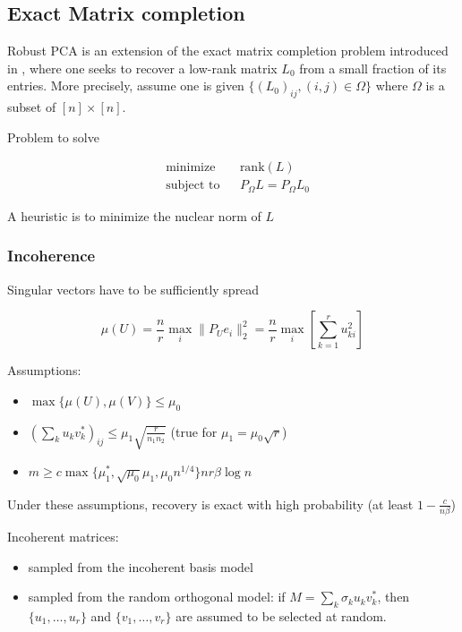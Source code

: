 \documentclass{../common/projectreport}
\begin{document}
\subsection{Exact Matrix completion}
Robust PCA is an extension of the exact matrix completion problem introduced in \cite{Candes:2009uq}, where one seeks to recover a low-rank matrix $L_0$ from a small fraction of its entries. More precisely, assume one is given $\{(L_0)_{ij}, (i,j)\in \Omega\}$ where $\Omega$ is a subset of $[n]\times [n]$.

Problem to solve

\begin{equation}
\begin{aligned}
&\text{minimize} && \text{rank}(L) \\
&\text{subject to} && P_\Omega L = P_\Omega L_0
\end{aligned}
\end{equation}


A heuristic is to minimize the nuclear norm of $L$

\subsubsection{Incoherence}

Singular vectors have to be sufficiently spread

\begin{equation}
\mu(U) = \frac{n}{r} \max_i \|P_U e_i\|_2^2 = \frac{n}{r} \max_i \left[ \sum_{k=1}^r u_{ki}^2 \right]
\label{emc_incoherence}
\end{equation}

Assumptions:
\begin{itemize}
\item $\max \{\mu(U), \mu(V)\} \leq \mu_0$
\item $\left( \sum_k u_kv_k^*\right)_{ij} \leq \mu_1 \sqrt{\frac{r}{n_1 n_2}}$ (true for $\mu_1 = \mu_0\sqrt{r}$)
\item $m \geq c \max \{ \mu_1^*, \sqrt{\mu_0}\mu_1, \mu_0 n^{1/4}\}n r \beta \log n$
\end{itemize}

Under these assumptions, recovery is exact with high probability (at least $1-\frac{c}{n\beta}$)

Incoherent matrices:
\begin{itemize}
\item sampled from the incoherent basis model
\item sampled from the random orthogonal model: if $M = \sum_k \sigma_k u_k v_k^*$, then $\{u_1, \dots, u_r\}$ and $\{v_1, \dots, v_r\}$ are assumed to be selected at random.

\end{itemize}
\end{document}
